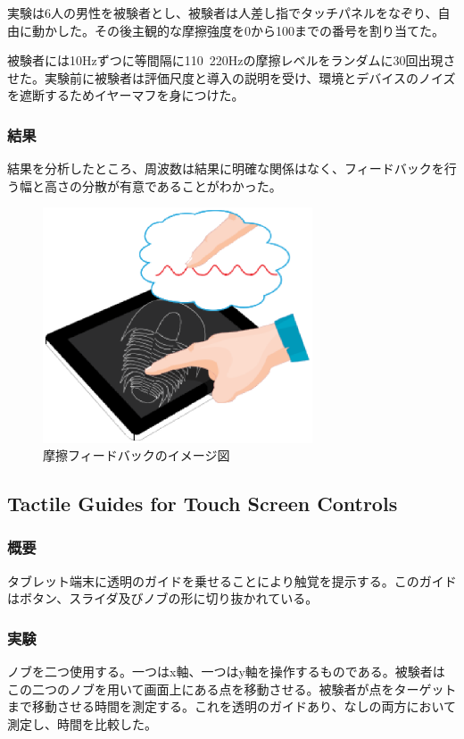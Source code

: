 \documentclass[11pt,a4paper]{jarticle}
\begin{document}
実験は6人の男性を被験者とし、被験者は人差し指でタッチパネルをなぞり、自由に動かした。その後主観的な摩擦強度を0から100までの番号を割り当てた。

被験者には10Hzずつに等間隔に110~220Hzの摩擦レベルをランダムに30回出現させた。実験前に被験者は評価尺度と導入の説明を受け、環境とデバイスのノイズを遮断するためイヤーマフを身につけた。

\subsubsection{結果}
結果を分析したところ、周波数は結果に明確な関係はなく、フィードバックを行う幅と高さの分散が有意であることがわかった。


\begin{figure}[H]
  \begin{center}
  \includegraphics[width=8cm]{fig/figure2.eps}
  \caption{摩擦フィードバックのイメージ図}
  \label{fig:1_test}
  \end{center}
\end{figure}

\subsection{Tactile Guides for Touch Screen Controls}
\subsubsection{概要}
タブレット端末に透明のガイドを乗せることにより触覚を提示する。このガイドはボタン、スライダ及びノブの形に切り抜かれている。

\subsubsection{実験}
ノブを二つ使用する。一つはx軸、一つはy軸を操作するものである。被験者はこの二つのノブを用いて画面上にある点を移動させる。被験者が点をターゲットまで移動させる時間を測定する。これを透明のガイドあり、なしの両方において測定し、時間を比較した。
\end{document}
